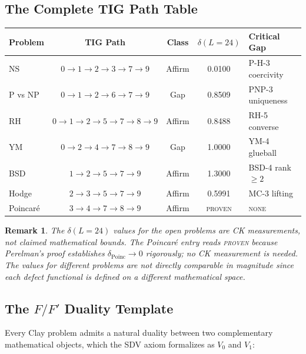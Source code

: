 \documentclass[11pt]{article}
\newtheorem{remark}[theorem]{Remark}
\begin{document}
\subsection{The Complete TIG Path Table}
\label{subsec:path-table}

\begin{center}
\begin{tabular}{@{}lcccl@{}}
\toprule
Problem & TIG Path & Class & $\delta(L{=}24)$ & Critical Gap \\
\midrule
NS & $0{\to}1{\to}2{\to}3{\to}7{\to}9$ & Affirm & 0.0100 & P-H-3 coercivity \\
P vs NP & $0{\to}1{\to}2{\to}6{\to}7{\to}9$ & Gap & 0.8509 & PNP-3 uniqueness \\
RH & $0{\to}1{\to}2{\to}5{\to}7{\to}8{\to}9$ & Affirm & 0.8488 & RH-5 converse \\
YM & $0{\to}2{\to}4{\to}7{\to}8{\to}9$ & Gap & 1.0000 & YM-4 glueball \\
BSD & $1{\to}2{\to}5{\to}7{\to}9$ & Affirm & 1.3000 & BSD-4 rank $\geq 2$ \\
Hodge & $2{\to}3{\to}5{\to}7{\to}9$ & Affirm & 0.5991 & MC-3 lifting \\
Poincar\'e & $3{\to}4{\to}7{\to}8{\to}9$ & Affirm & \textsc{proven} & \textsc{none} \\
\bottomrule
\end{tabular}
\end{center}

\begin{remark}
The $\delta(L{=}24)$ values for the open problems are CK measurements,
not claimed mathematical bounds.  The Poincar\'e entry reads
\textsc{proven} because Perelman's proof establishes
$\delta_{\mathrm{Poinc}} \to 0$ rigorously; no CK measurement is
needed.  The values for different problems are not directly comparable
in magnitude since each defect functional is defined on a different
mathematical space.
\end{remark}

\subsection{The $F/F'$ Duality Template}
\label{subsec:duality}

Every Clay problem admits a natural duality between two complementary
mathematical objects, which the SDV axiom formalizes as $V_0$ and $V_1$:
\end{document}
